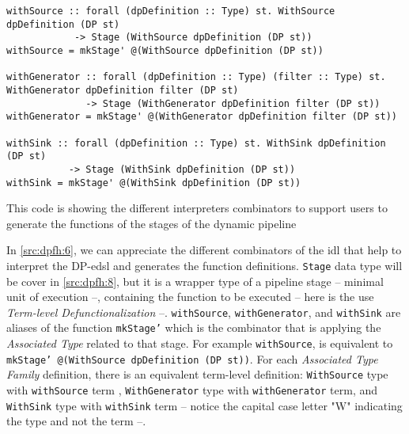 \begin{listing}[H]
  \begin{verbatim}
withSource :: forall (dpDefinition :: Type) st. WithSource dpDefinition (DP st) 
            -> Stage (WithSource dpDefinition (DP st))
withSource = mkStage' @(WithSource dpDefinition (DP st))

withGenerator :: forall (dpDefinition :: Type) (filter :: Type) st. WithGenerator dpDefinition filter (DP st) 
              -> Stage (WithGenerator dpDefinition filter (DP st))
withGenerator = mkStage' @(WithGenerator dpDefinition filter (DP st))

withSink :: forall (dpDefinition :: Type) st. WithSink dpDefinition (DP st) 
           -> Stage (WithSink dpDefinition (DP st))
withSink = mkStage' @(WithSink dpDefinition (DP st))
  \end{verbatim}
  \caption[{[\texttt{Stage.hs}] Using with Interpreters of \acrshort{dp} encoded in $G_{dsl}$}]{This code is showing the different interpreters combinators to support users to generate the functions of the stages of the dynamic pipeline}
  \label{src:dpfh:6}
\end{listing}

In \autoref{src:dpfh:6}, we can appreciate the different combinators of the \acrshort{idl} that help to interpret the DP-\acrshort{edsl} and generates the function definitions.
\texttt{Stage} data type will be cover in \autoref{src:dpfh:8}, but it is a wrapper type of a pipeline stage -- minimal unit of execution --, containing the function to be executed -- here is the use \emph{Term-level Defunctionalization} --.
\texttt{withSource}, \texttt{withGenerator}, and \texttt{withSink} are aliases of the function \texttt{mkStage'} which is the combinator that is applying the \emph{Associated Type} related to that stage. For example \texttt{withSource}, is equivalent to \texttt{mkStage' @(WithSource dpDefinition (DP st))}.
For each \emph{Associated Type Family} definition, there is an equivalent term-level definition: \texttt{WithSource} type with \texttt{withSource} term , \texttt{WithGenerator} type with \texttt{withGenerator} term, and \texttt{WithSink} type with \texttt{withSink} term -- notice the capital case letter "W" indicating the type and not the term --.

